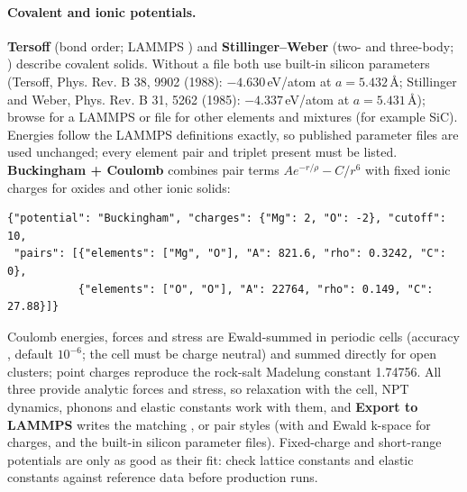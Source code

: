 \paragraph{Covalent and ionic potentials.} \textbf{Tersoff} (bond order; LAMMPS ) and \textbf{Stillinger--Weber} (two- and three-body; ) describe covalent solids. Without a file both use built-in silicon parameters (Tersoff, Phys. Rev. B 38, 9902 (1988): $-4.630$\,eV/atom at $a = 5.432$\,\AA; Stillinger and Weber, Phys. Rev. B 31, 5262 (1985): $-4.337$\,eV/atom at $a = 5.431$\,\AA); browse for a LAMMPS  or  file for other elements and mixtures (for example SiC). Energies follow the LAMMPS definitions exactly, so published parameter files are used unchanged; every element pair and triplet present must be listed. \textbf{Buckingham + Coulomb} combines pair terms $A e^{-r/\rho} - C/r^6$ with fixed ionic charges for oxides and other ionic solids:
\begin{lstlisting}
{"potential": "Buckingham", "charges": {"Mg": 2, "O": -2}, "cutoff": 10,
 "pairs": [{"elements": ["Mg", "O"], "A": 821.6, "rho": 0.3242, "C": 0},
           {"elements": ["O", "O"], "A": 22764, "rho": 0.149, "C": 27.88}]}
\end{lstlisting}
Coulomb energies, forces and stress are Ewald-summed in periodic cells (accuracy , default $10^{-6}$; the cell must be charge neutral) and summed directly for open clusters; point charges reproduce the rock-salt Madelung constant 1.74756. All three provide analytic forces and stress, so relaxation with the cell, NPT dynamics, phonons and elastic constants work with them, and \textbf{Export to LAMMPS} writes the matching ,  or  pair styles (with  and Ewald k-space for charges, and the built-in silicon parameter files). Fixed-charge and short-range potentials are only as good as their fit: check lattice constants and elastic constants against reference data before production runs.

